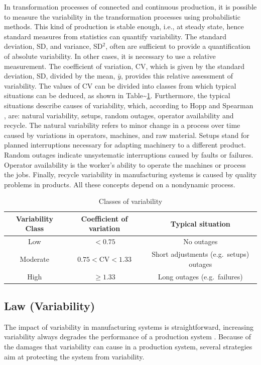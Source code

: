 \documentclass{article}
\begin{document}
In transformation processes of connected and continuous production, it is possible to measure the variability in the transformation processes using probabilistic methods.
This kind of production is stable enough, i.e., at steady state, hence standard measures from statistics can quantify variability.
The standard deviation, SD, and variance, SD\(^2\), often are sufficient to provide a quantification of absolute variability.
In other cases, it is necessary to use a relative measurement.
The coefficient of variation, CV, which is given by the standard deviation, SD, divided by the mean, \(\bar{y}\), provides this relative assessment of variability.
The values of CV can be divided into classes from which typical situations can be deduced, as shown in Table\textasciitilde{}\ref{tb:Classes of variability}.
Furthermore, the typical situations describe causes of variability, which, according to Hopp and Spearman \cite{Hopp2001}, are: natural variability, setups, random outages, operator availability and recycle.
The natural variability refers to minor change in a process over time caused by variations in operators, machines, and raw material.
Setups stand for planned interruptions necessary for adapting machinery to a different product.
Random outages indicate unsystematic interruptions caused by faults or failures.
Operator availability is the worker's ability to operate the machines or process the jobs.
Finally, recycle variability in manufacturing systems is caused by quality problems in products.
All these concepts depend on a nondynamic process.

\begin{table}
\centering
\caption{Classes of variability}\label{tb:Classes of variability}
\begin{tabular}{ccc}
Variability Class & Coefficient of variation & Typical situation \\ \hline
Low & $< 0.75$ & No outages \\
Moderate & $0.75<$CV$<1.33$ & Short adjustments (e.g.\ setups) outages \\
High & $\geq 1.33$ & Long outages (e.g.\ failures)
\end{tabular}
\end{table}

\subsection{Law (Variability)}

The impact of variability in manufacturing systems is straightforward, increasing variability always degrades the performance of a production system \citep[p.295]{Hopp2001}.
Because of the damages that variability can cause in a production system, several strategies aim at protecting the system from variability.
\end{document}

